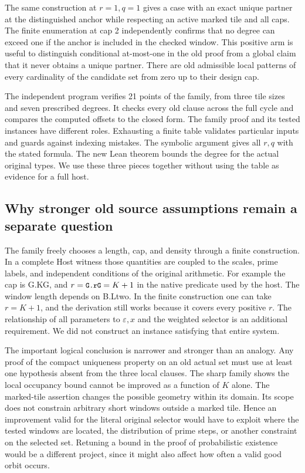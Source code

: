 \documentclass[12pt,letterpaper]{article}
\DeclareRobustCommand{\id}[1]{\mbox{\small\ttfamily #1}}
\begin{document}
The same construction at \(r=1,q=1\) gives a case with an exact unique partner at the distinguished anchor while respecting an active marked tile and all caps. The finite enumeration at cap 2 independently confirms that no degree can exceed one if the anchor is included in the checked window. This positive arm is useful to distinguish conditional at-most-one in the old proof from a global claim that it never obtains a unique partner. There are old admissible local patterns of every cardinality of the candidate set from zero up to their design cap.

The independent program verifies 21 points of the family, from three tile sizes and seven prescribed degrees. It checks every old clause across the full cycle and compares the computed offsets to the closed form. The family proof and its tested instances have different roles. Exhausting a finite table validates particular inputs and guards against indexing mistakes. The symbolic argument gives all \(r,q\) with the stated formula. The new Lean theorem bounds the degree for the actual original types. We use these three pieces together without using the table as evidence for a full host.

\subsection{Why stronger old source assumptions remain a separate question}

The family freely chooses a length, cap, and density through a finite construction. In a complete \id{Host} witness those quantities are coupled to the scales, prime labels, and independent conditions of the original arithmetic. For example the cap is \id{G.KG}, and \(r=\id{G.rG}=K+1\) in the native predicate used by the host. The window length depends on \id{B.Ltwo}. In the finite construction one can take \(r=K+1\), and the derivation still works because it covers every positive \(r\). The relationship of all parameters to \(\varepsilon,x\) and the weighted selector is an additional requirement. We did not construct an instance satisfying that entire system.

The important logical conclusion is narrower and stronger than an analogy. Any proof of the compact uniqueness property on an old actual set must use at least one hypothesis absent from the three local clauses. The sharp family shows the local occupancy bound cannot be improved as a function of \(K\) alone. The marked-tile assertion changes the possible geometry within its domain. Its scope does not constrain arbitrary short windows outside a marked tile. Hence an improvement valid for the literal original selector would have to exploit where the tested windows are located, the distribution of prime steps, or another constraint on the selected set. Retuning a bound in the proof of probabilistic existence would be a different project, since it might also affect how often a valid good orbit occurs.
\end{document}
